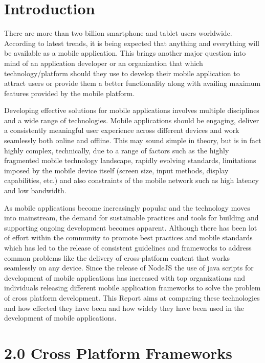 \documentclass[12pt]{extreport}
\begin{document}
\newpage
\section*{Introduction}
There are more than two billion smartphone and tablet users worldwide. According to latest trends, it is being expected that anything and everything will be available as a mobile application. This brings another major question into mind of an application developer or an organization that which technology/platform should they use to develop their mobile application to attract users or provide them a better functionality along with availing maximum features provided by the mobile platform.

Developing effective solutions for mobile applications involves multiple disciplines and a wide range of technologies. Mobile applications should be engaging, deliver a consistently meaningful user experience across different devices and work seamlessly both online and offline. This may sound simple in theory, but is in fact highly complex, technically, due to a range of factors such as the highly fragmented mobile technology landscape, rapidly evolving standards, limitations imposed by the mobile device itself (screen size, input methods, display capabilities, etc.) and also constraints of the mobile network such as high latency and low bandwidth.

As mobile applications become increasingly popular and the technology moves into mainstream, the demand for sustainable practices and tools for building and supporting ongoing development becomes apparent. Although there has been lot of effort within the community to promote best practices and mobile standards which has led to the release of consistent guidelines and frameworks to address common problems like the delivery of cross-platform content that works seamlessly on any device. 
Since the release of NodeJS the use of java scripts for development of mobile applications has increased with top organizations and individuals releasing different mobile application frameworks to solve the problem of cross platform development. 
This Report aims at comparing these technologies and how effected they have been and how widely they have been used in the development of mobile applications.

\newpage
\section*{2.0 Cross Platform Frameworks}
\end{document}
